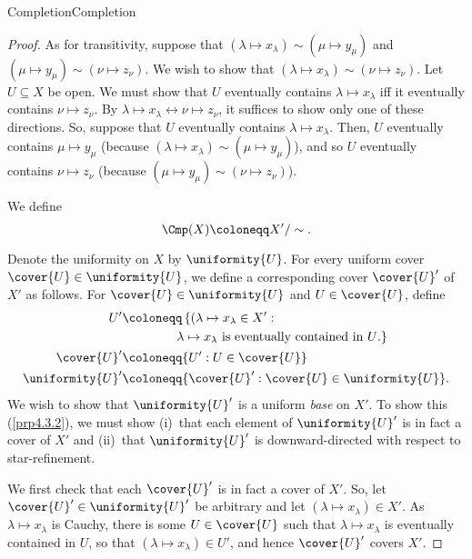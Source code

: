 \begin{thm}{Completion}{Completion}
\begin{proof}
As for transitivity, suppose that $(\lambda \mapsto x_\lambda )\sim (\mu \mapsto y_\mu )$ and $(\mu \mapsto y_\mu )\sim (\nu \mapsto z_\nu)$.  We wish to show that $(\lambda \mapsto x_\lambda )\sim (\nu \mapsto z_\nu )$.  Let $U\subseteq X$ be open.  We must show that $U$ eventually contains $\lambda \mapsto x_\lambda$ iff it eventually contains $\nu \mapsto z_\nu$.  By $\lambda \mapsto x_\lambda \leftrightarrow \nu \mapsto z_\nu$, it suffices to show only one of these directions.  So, suppose that $U$ eventually contains $\lambda \mapsto x_\lambda$.  Then, $U$ eventually contains $\mu \mapsto y_\mu$ (because $(\lambda \mapsto x_\lambda )\sim (\mu \mapsto y_\mu )$), and so $U$ eventually contains $\nu \mapsto z_\nu$ (because $(\mu \mapsto y_\mu )\sim (\nu \mapsto z_\nu )$).

We define
\begin{equation}
\Cmp (X)\coloneqq X'/\sim .
\end{equation}

Denote the uniformity on $X$ by $\uniformity{U}$.  For every uniform cover $\cover{U}\in \uniformity{U}$, we define a corresponding cover $\cover{U}'$ of $X'$ as follows.  For $\cover{U}\in \uniformity{U}$ and $U\in \cover{U}$, define
\begin{equation}\label{B.26}
\begin{split}
U' & \coloneqq \left\{ (\lambda \mapsto x_{\lambda}\in X':\right. \\ & \qquad \qquad \left. \lambda \mapsto x_{\lambda}\text{ is eventually contained in }U\text{.}\right\} \\
\cover{U}' & \coloneqq \{ U':U\in \cover{U}\} \\
\uniformity{U}' & \coloneqq \{ \cover{U}':\cover{U}\in \uniformity{U}\} .
\end{split}
\end{equation}
We wish to show that $\uniformity{U}'$ is a uniform \emph{base} on $X'$.  To show this (\cref{prp4.3.2}), we must show (i)~that each element of $\uniformity{U}'$ is in fact a cover of $X'$ and (ii)~that $\uniformity{U}'$ is downward-directed with respect to star-refinement.

We first check that each $\cover{U}'$ is in fact a cover of $X'$.  So, let $\cover{U}'\in \uniformity{U}'$ be arbitrary and let $(\lambda \mapsto x_{\lambda})\in X'$.  As $\lambda \mapsto x_{\lambda}$ is Cauchy, there is some $U\in \cover{U}$ such that $\lambda \mapsto x_{\lambda}$ is eventually contained in $U$, so that $(\lambda \mapsto x_{\lambda})\in U'$, and hence $\cover{U}'$ covers $X'$.


\end{proof}
\end{thm}
